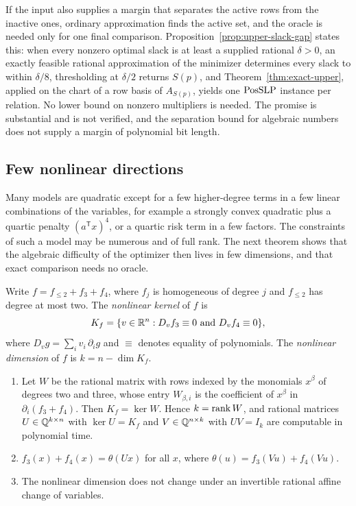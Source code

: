 If the input also supplies a margin that separates the active rows from the
inactive ones, ordinary approximation finds the active set, and the oracle is
needed only for one final comparison. Proposition~\ref{prop:upper-slack-gap}
states this: when every nonzero optimal slack is at least a supplied rational
$\delta>0$, an exactly feasible rational approximation of the minimizer
determines every slack to within $\delta/8$, thresholding at $\delta/2$
returns $S(p)$, and
Theorem~\ref{thm:exact-upper}, applied on the chart of a row basis of
$A_{S(p)}$, yields one $\mathrm{PosSLP}$ instance per relation. No lower bound on
nonzero multipliers is needed. The promise is substantial and is not verified,
and the separation bound for algebraic numbers does not supply a margin of
polynomial bit length.

\subsection{Few nonlinear directions}
\label{sec:constraints-nonlinear}

Many models are quadratic except for a few higher-degree terms in a few
linear combinations of the variables, for example a strongly convex quadratic
plus a quartic penalty $(a^{\mathsf T}x)^4$, or a quartic risk term in a few
factors. The constraints of such a model may be numerous and of full rank.
The next theorem shows that the algebraic difficulty of the optimizer then
lives in few dimensions, and that exact comparison needs no oracle.

\begin{definition}
\label{def:constraints-nonlinear-dimension}
Write $f=f_{\le2}+f_3+f_4$, where $f_j$ is homogeneous of degree $j$ and
$f_{\le2}$ has degree at most two. The \emph{nonlinear kernel} of $f$ is
\[
 K_f=\{v\in\mathbb R^n:D_vf_3\equiv0\text{ and }D_vf_4\equiv0\},
\]
where $D_vg=\sum_iv_i\,\partial_ig$ and $\equiv$ denotes equality of
polynomials. The \emph{nonlinear dimension} of $f$ is $k=n-\dim K_f$.
\end{definition}

\begin{lemma}
\label{lem:constraints-essential}
\begin{enumerate}[label=(\alph*)]
\item Let $W$ be the rational matrix with rows indexed by the monomials
$x^\beta$ of degrees two and three, whose entry $W_{\beta,i}$ is the
coefficient of $x^\beta$ in $\partial_i(f_3+f_4)$. Then $K_f=\ker W$. Hence
$k=\operatorname{rank} W$, and rational matrices $U\in\mathbb Q^{k\times n}$ with $\ker U=K_f$ and
$V\in\mathbb Q^{n\times k}$ with $UV=I_k$ are computable in polynomial time.
\item $f_3(x)+f_4(x)=\theta(Ux)$ for all $x$, where
$\theta(u)=f_3(Vu)+f_4(Vu)$.
\item The nonlinear dimension does not change under an invertible rational
affine change of variables.
\end{enumerate}
\end{lemma}


